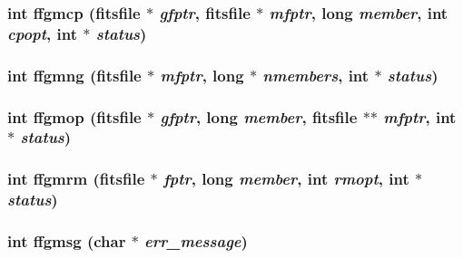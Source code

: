 \subsubsection{\setlength{\rightskip}{0pt plus 5cm}int ffgmcp (\bf{fitsfile} $\ast$ {\em gfptr}, \bf{fitsfile} $\ast$ {\em mfptr}, long {\em member}, int {\em cpopt}, int $\ast$ {\em status})}\label{fitsio__64_8h_d83bfc8f05c1ecdb704484508df35e48}


\subsubsection{\setlength{\rightskip}{0pt plus 5cm}int ffgmng (\bf{fitsfile} $\ast$ {\em mfptr}, long $\ast$ {\em nmembers}, int $\ast$ {\em status})}\label{fitsio__64_8h_4ce8704aab9e63b3a93ccbf135f20eab}


\subsubsection{\setlength{\rightskip}{0pt plus 5cm}int ffgmop (\bf{fitsfile} $\ast$ {\em gfptr}, long {\em member}, \bf{fitsfile} $\ast$$\ast$ {\em mfptr}, int $\ast$ {\em status})}\label{fitsio__64_8h_eb970a59dfa22c61d5df8bc212391228}


\subsubsection{\setlength{\rightskip}{0pt plus 5cm}int ffgmrm (\bf{fitsfile} $\ast$ {\em fptr}, long {\em member}, int {\em rmopt}, int $\ast$ {\em status})}\label{fitsio__64_8h_ae2190c557659d6bea87a6ba2e5c152b}


\subsubsection{\setlength{\rightskip}{0pt plus 5cm}int ffgmsg (char $\ast$ {\em err\_\-message})}\label{fitsio__64_8h_778ec78df3764f3a5928aa564a4874a8}


